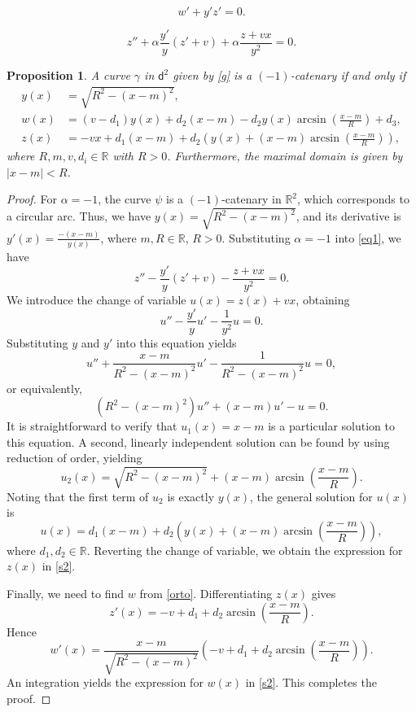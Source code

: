 \documentclass[10pt,a4paper]{amsart}
\newtheorem{proposition}{Proposition}
\def\d{\mathsf d}
\def\r{\mathbb R}
\begin{document}
\begin{equation}\label{orto}
w'+y'z'=0.
\end{equation}

\begin{equation}\label{eq1}
 z'' + \alpha \frac{y'}{y}(z'+v) + \alpha \frac{z+vx}{y^2} = 0.
\end{equation}

\begin{proposition}\label{p25}
A curve $\gamma $ in $\d^2$     given by \eqref{g} is a $(-1)$-catenary if and only if 
\begin{equation}
\begin{split}\label{s2}
y(x)&=\sqrt{R^2-(x-m)^2},\\
w(x)&=(v-d_1) y(x) + d_2 (x-m) - d_2 y(x) \arcsin\left(\frac{x-m}{R}\right) + d_3,\\
z(x)&=-vx + d_1(x-m) + d_2 \left( y(x) + (x-m)\arcsin\left(\frac{x-m}{R}\right) \right),
\end{split}
\end{equation}
where $R, m, v, d_i \in \mathbb{R}$ with $R>0$. Furthermore, the maximal domain is given by $|x-m| < R$.
\end{proposition}

\begin{proof}
For $\alpha=-1$, the   curve $\psi$ is a $(-1)$-catenary in $\r^2$, which corresponds to a circular arc. Thus, we have $y(x) = \sqrt{R^2-(x-m)^2}$, and its derivative is $y'(x) = \frac{-(x-m)}{y(x)}$, where $m,R\in \r$, $R>0$. Substituting $\alpha=-1$ into \eqref{eq1}, we have
$$
z'' - \frac{y'}{y}(z'+v) - \frac{z+vx}{y^2} = 0.
$$
We introduce the change of variable $u(x)=z(x)+vx$, obtaining
$$
u'' - \frac{y'}{y} u' - \frac{1}{y^2} u = 0.
$$
Substituting $y$ and $y'$ into this equation yields
$$
u'' + \frac{x-m}{R^2-(x-m)^2} u' - \frac{1}{R^2-(x-m)^2} u = 0,
$$
or equivalently,
$$
(R^2-(x-m)^2) u'' + (x-m) u' - u = 0.
$$
It is straightforward to verify that $u_1(x) = x-m$ is a particular solution to this equation. A second, linearly independent solution can be found by using reduction of order, yielding 
$$u_2(x) = \sqrt{R^2-(x-m)^2} + (x-m)\arcsin\left(\frac{x-m}{R}\right).$$
 Noting that the first term of $u_2$ is exactly $y(x)$, the general solution for $u(x)$ is
$$
u(x) = d_1 (x-m) + d_2 \left( y(x) + (x-m)\arcsin\left(\frac{x-m}{R}\right) \right),
$$
where $d_1, d_2 \in \mathbb{R}$. Reverting the change of variable, we obtain the expression for $z(x)$ in  \eqref{s2}. 


Finally, we need to find $w$ from \eqref{orto}. Differentiating $z(x)$ gives
$$
z'(x) = -v + d_1 + d_2 \arcsin\left(\frac{x-m}{R}\right).
$$
Hence
$$w'(x) = \frac{x-m}{\sqrt{R^2-(x-m)^2}} \left( -v + d_1 + d_2 \arcsin\left(\frac{x-m}{R}\right) \right).$$
An integration yields the expression for $w(x)$ in \eqref{s2}.   This completes the proof.
\end{proof}
\end{document}
